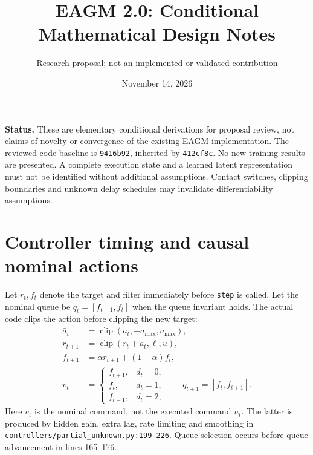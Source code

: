 \documentclass[10pt]{article}
\title{EAGM 2.0: Conditional Mathematical Design Notes}
\author{Research proposal; not an implemented or validated contribution}
\date{November 14, 2026}
\begin{document}
\maketitle
\noindent\textbf{Status.} These are elementary conditional derivations for proposal review, not claims of novelty or convergence of the existing EAGM implementation. The reviewed code baseline is \texttt{9416b92}, inherited by \texttt{412cf8c}. No new training results are presented. A complete execution state and a learned latent representation must not be identified without additional assumptions. Contact switches, clipping boundaries and unknown delay schedules may invalidate differentiability assumptions.

\section{Controller timing and causal nominal actions}
Let $r_t,f_t$ denote the target and filter immediately before \texttt{step} is called. Let the nominal queue be $q_t=[f_{t-1},f_t]$ when the queue invariant holds. The actual code clips the action before clipping the new target:
\begin{align}
\bar a_t&=\operatorname{clip}(a_t,-a_{\max},a_{\max}),\\
r_{t+1}&=\operatorname{clip}(r_t+\bar a_t,\ell,u),\\
f_{t+1}&=\alpha r_{t+1}+(1-\alpha)f_t,\\
v_t&=\begin{cases} f_{t+1},&d_t=0,\\ f_t,&d_t=1,\\f_{t-1},&d_t=2,\end{cases}\qquad
q_{t+1}=[f_t,f_{t+1}].
\end{align}
Here $v_t$ is the nominal command, not the executed command $u_t$. The latter is produced by hidden gain, extra lag, rate limiting and smoothing in \texttt{controllers/partial\_unknown.py:199--226}. Queue selection occurs before queue advancement in lines 165--176.
\end{document}
